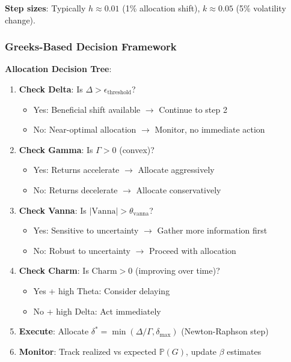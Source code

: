 \textbf{Step sizes}: Typically $h \approx 0.01$ (1\% allocation shift), $k \approx 0.05$ (5\% volatility change).

\subsubsection{Greeks-Based Decision Framework}

\textbf{Allocation Decision Tree}:

\begin{enumerate}
\item \textbf{Check Delta}: Is $\Delta > \epsilon_{\text{threshold}}$?
   \begin{itemize}
   \item Yes: Beneficial shift available $\rightarrow$ Continue to step 2
   \item No: Near-optimal allocation $\rightarrow$ Monitor, no immediate action
   \end{itemize}

\item \textbf{Check Gamma}: Is $\Gamma > 0$ (convex)?
   \begin{itemize}
   \item Yes: Returns accelerate $\rightarrow$ Allocate aggressively
   \item No: Returns decelerate $\rightarrow$ Allocate conservatively
   \end{itemize}

\item \textbf{Check Vanna}: Is $|\text{Vanna}| > \theta_{\text{vanna}}$?
   \begin{itemize}
   \item Yes: Sensitive to uncertainty $\rightarrow$ Gather more information first
   \item No: Robust to uncertainty $\rightarrow$ Proceed with allocation
   \end{itemize}

\item \textbf{Check Charm}: Is $\text{Charm} > 0$ (improving over time)?
   \begin{itemize}
   \item Yes + high Theta: Consider delaying
   \item No + high Delta: Act immediately
   \end{itemize}

\item \textbf{Execute}: Allocate $\delta^* = \min(\Delta / \Gamma, \delta_{\max})$ (Newton-Raphson step)

\item \textbf{Monitor}: Track realized vs expected $\mathbb{P}(G)$, update $\beta$ estimates
\end{enumerate}

